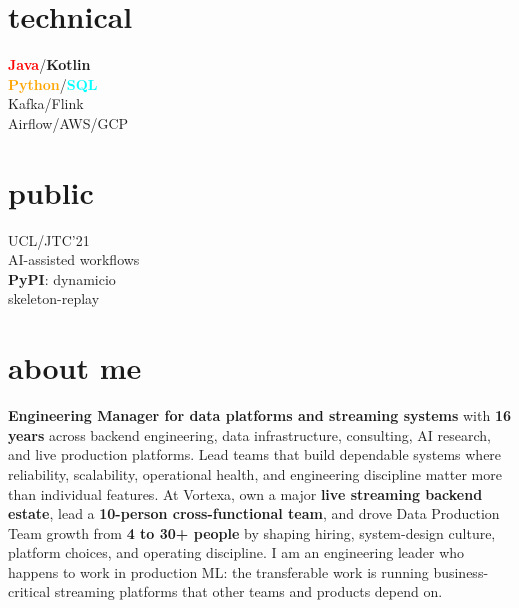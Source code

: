 \documentclass[]{../../../../friggeri-cv}
\begin{document}
\begin{aside}
            \section{technical}
            {\footnotesize \textbf{\textcolor{red}{Java}}/\textbf{\textcolor{red!50!black}{Kotlin}}\\\textbf{\textcolor{orange}{Python}}/\textbf{\textcolor{cyan}{SQL}}\\Kafka/Flink\\Airflow/AWS/GCP}
            \section{public}
            {\footnotesize UCL/JTC'21\\AI-assisted workflows\\\textbf{PyPI}: dynamicio\\skeleton-replay}
    \end{aside}

\section{about me}
{\small \textbf{Engineering Manager for data platforms and streaming systems} with \textbf{16 years} across backend engineering, data infrastructure, consulting, AI research, and live production platforms. Lead teams that build dependable systems where reliability, scalability, operational health, and engineering discipline matter more than individual features. At Vortexa, own a major \textbf{live streaming backend estate}, lead a \textbf{10-person cross-functional team}, and drove Data Production Team growth from \textbf{4 to 30+ people} by shaping hiring, system-design culture, platform choices, and operating discipline. I am an engineering leader who happens to work in production ML: the transferable work is running business-critical streaming platforms that other teams and products depend on.}
\end{document}
